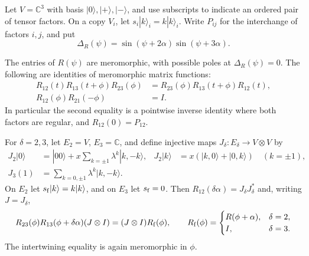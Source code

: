 Let $V=\mathbb C^3$ with basis $|0\rangle,|+\rangle,|-\rangle$, and use
subscripts to indicate an ordered pair of tensor factors. On a copy
$V_i$, let $s_i|k\rangle_i=k|k\rangle_i$. Write $P_{ij}$ for the
interchange of factors $i,j$, and put
\[
\Delta_R(\psi)=\sin(\psi+2\alpha)\sin(\psi+3\alpha).
\]
\begin{lemma}\label{j:local-exchange-fusion}
The entries of $R(\psi)$ are meromorphic, with possible poles at
$\Delta_R(\psi)=0$. The following are identities of meromorphic matrix
functions:
\[
\begin{split}
R_{12}(t)R_{13}(t+\phi)R_{23}(\phi)
 &=R_{23}(\phi)R_{13}(t+\phi)R_{12}(t),\\
R_{12}(\phi)R_{21}(-\phi)&=I.
\end{split}
\]
In particular the second equality is a pointwise inverse identity
where both factors are regular, and $R_{12}(0)=P_{12}$.

For $\delta=2,3$, let $E_2=V$, $E_3=\mathbb C$, and define injective
maps $J_\delta:E_\delta\to V\otimes V$ by
\[
\begin{aligned}
J_2|0\rangle&=|00\rangle+x\sum_{k=\pm1}\lambda^k|k,-k\rangle,
&J_2|k\rangle&=x(|k,0\rangle+|0,k\rangle)\quad(k=\pm1),\\
J_3(1)&=\sum_{k=0,\pm1}\lambda^k|k,-k\rangle.
\end{aligned}
\]
On $E_2$ let $s_{\rm f}|k\rangle=k|k\rangle$, and on $E_3$ let
$s_{\rm f}=0$.
Then $R_{12}(\delta\alpha)=J_\delta J_\delta^*$ and, writing $J=J_\delta$,
\[
R_{23}(\phi)R_{13}(\phi+\delta\alpha)(J\otimes I)
 =(J\otimes I)R_{\rm f}(\phi),\qquad
R_{\rm f}(\phi)=
\begin{cases}
R(\phi+\alpha),&\delta=2,\\
I,&\delta=3.
\end{cases}
\]
The intertwining equality is again meromorphic in $\phi$.
\end{lemma}
